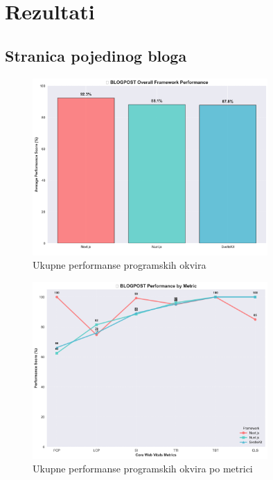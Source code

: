 \section{Rezultati}

\subsection{Stranica pojedinog bloga}

\begin{figure}[H]
    \centering
    \includegraphics[width=0.8\textwidth]{slike/rezultati/blog-post/blogPost_framework_overall_performance.png}
    \caption{Ukupne performanse programskih okvira}
    \label{fig:testiranje-blog-post-ukupne-performanse}
\end{figure}

\begin{figure}[H]
    \centering
    \includegraphics[width=0.8\textwidth]{slike/rezultati/blog-post/blogPost_performance_by_metric.png}
    \caption{Ukupne performanse programskih okvira po metrici}
    \label{fig:testiranje-blog-post-performanse-po-metrici}
\end{figure}

